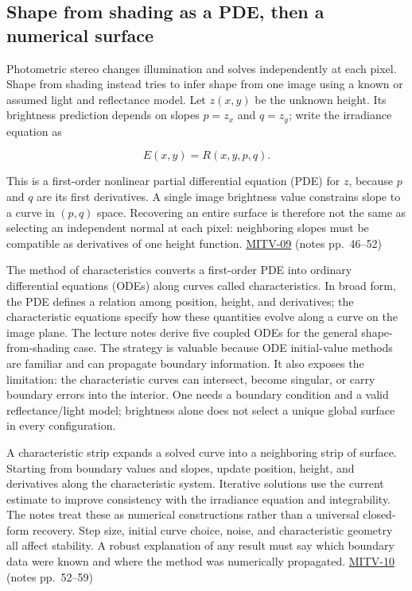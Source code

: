 \subsection{Shape from shading as a PDE, then a numerical surface}\label{04-visual-computing-ii-ch032-shape-from-shading-as-a-pde-then-a-numerical-surface}

Photometric stereo changes illumination and solves independently at each pixel. Shape from shading instead tries to infer shape from one image using a known or assumed light and reflectance model. Let \(z(x,y)\) be the unknown height. Its brightness prediction depends on slopes \(p=z_x\) and \(q=z_y\); write the irradiance equation as

\[
E(x,y)=R(x,y,p,q).
\]

This is a first-order nonlinear partial differential equation (PDE) for \(z\), because \(p\) and \(q\) are its first derivatives. A single image brightness value constrains slope to a curve in \((p,q)\) space. Recovering an entire surface is therefore not the same as selecting an independent normal at each pixel: neighboring slopes must be compatible as derivatives of one height function. \hyperref[04-visual-computing-ii-ch036-mitv-09---shape-from-shading-general-case---from-first-order-nonlinear-pde-to-five-odes]{MITV-09} (notes pp.~46--52)

The method of characteristics converts a first-order PDE into ordinary differential equations (ODEs) along curves called characteristics. In broad form, the PDE defines a relation among position, height, and derivatives; the characteristic equations specify how these quantities evolve along a curve on the image plane. The lecture notes derive five coupled ODEs for the general shape-from-shading case. The strategy is valuable because ODE initial-value methods are familiar and can propagate boundary information. It also exposes the limitation: the characteristic curves can intersect, become singular, or carry boundary errors into the interior. One needs a boundary condition and a valid reflectance/light model; brightness alone does not select a unique global surface in every configuration.

A characteristic strip expands a solved curve into a neighboring strip of surface. Starting from boundary values and slopes, update position, height, and derivatives along the characteristic system. Iterative solutions use the current estimate to improve consistency with the irradiance equation and integrability. The notes treat these as numerical constructions rather than a universal closed-form recovery. Step size, initial curve choice, noise, and characteristic geometry all affect stability. A robust explanation of any result must say which boundary data were known and where the method was numerically propagated. \hyperref[04-visual-computing-ii-ch036-mitv-10---characteristic-strip-expansion-shape-from-shading-iterative-solutions]{MITV-10} (notes pp.~52--59)

